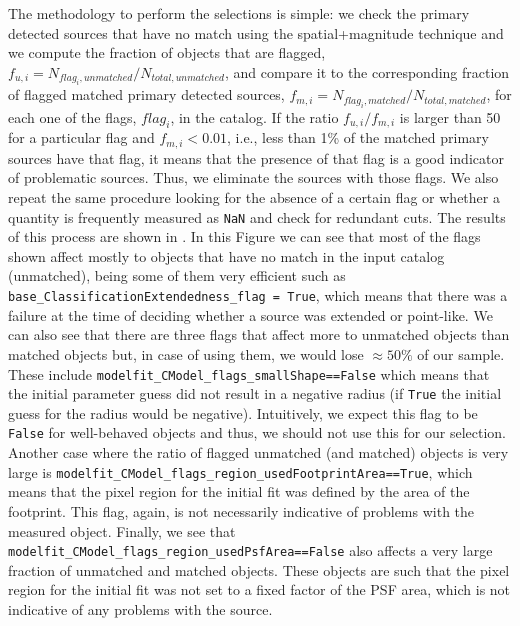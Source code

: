\documentclass[twocolumn]{aastex62}
\begin{document}
The methodology to perform the selections is simple: we check the primary detected sources that have no match using the spatial+magnitude technique and we compute the fraction of objects that are flagged, $f_{u,i} = N_{flag_{i}, unmatched}/N_{total, unmatched}$, and compare it to the corresponding fraction of flagged matched primary detected sources, $f_{m,i} = N_{flag_{i}, matched}/N_{total, matched}$, for each one of the flags, $flag_{i}$, in the catalog. If the ratio $f_{u,i}/f_{m,i}$ is larger than 50 for a particular flag and $f_{m,i} < 0.01$, i.e., less than 1\% of the matched primary sources have that flag, it means that the presence of that flag is a good indicator of problematic sources. Thus, we eliminate the sources with those flags. We also repeat the same procedure looking for the absence of a certain flag or whether a quantity is frequently measured as \texttt{NaN} and check for redundant cuts. The results of this process are shown in . In this Figure we can see that most of the flags shown affect mostly to objects that have no match in the input catalog (unmatched), being some of them very efficient such as \texttt{base\_ClassificationExtendedness\_flag = True}, which means that there was a failure at the time of deciding whether a source was extended or point-like. We can also see that there are three flags that affect more to unmatched objects than matched objects but, in case of using them, we would lose $\approx 50\%$ of our sample. These include \texttt{modelfit\_CModel\_flags\_smallShape==False} which means that the initial parameter guess did not result in a negative radius (if \texttt{True} the initial guess for the radius would be negative). Intuitively, we expect this flag to be \texttt{False} for well-behaved objects and thus, we should not use this for our selection. Another case where the ratio of flagged unmatched (and matched) objects is very large is \texttt{modelfit\_CModel\_flags\_region\_usedFootprintArea==True}, which means that the pixel region for the initial fit was defined by the area of the footprint. This flag, again, is not necessarily indicative of problems with the measured object. Finally, we see that \texttt{modelfit\_CModel\_flags\_region\_usedPsfArea==False} also affects a very large fraction of unmatched and matched objects. These objects are such that the pixel region for the initial fit was not set to a fixed factor of the PSF area, which is not indicative of any problems with the source. 
\end{document}
